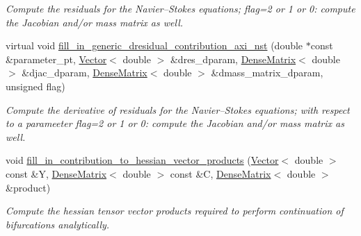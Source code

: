 \begin{DoxyCompactItemize}
\begin{DoxyCompactList}\small\item\em Compute the residuals for the Navier--Stokes equations; flag=2 or 1 or 0\+: compute the Jacobian and/or mass matrix as well. \end{DoxyCompactList}\item 
virtual void \hyperlink{classoomph_1_1GeneralisedNewtonianAxisymmetricNavierStokesEquations_a162f23398b74cb7a99506c4f8f277811}{fill\+\_\+in\+\_\+generic\+\_\+dresidual\+\_\+contribution\+\_\+axi\+\_\+nst} (double $\ast$const \&parameter\+\_\+pt, \hyperlink{classoomph_1_1Vector}{Vector}$<$ double $>$ \&dres\+\_\+dparam, \hyperlink{classoomph_1_1DenseMatrix}{Dense\+Matrix}$<$ double $>$ \&djac\+\_\+dparam, \hyperlink{classoomph_1_1DenseMatrix}{Dense\+Matrix}$<$ double $>$ \&dmass\+\_\+matrix\+\_\+dparam, unsigned flag)
\begin{DoxyCompactList}\small\item\em Compute the derivative of residuals for the Navier--Stokes equations; with respect to a parameeter flag=2 or 1 or 0\+: compute the Jacobian and/or mass matrix as well. \end{DoxyCompactList}\item 
void \hyperlink{classoomph_1_1GeneralisedNewtonianAxisymmetricNavierStokesEquations_a2087bbf2d46364b9dc414a7ca90f25de}{fill\+\_\+in\+\_\+contribution\+\_\+to\+\_\+hessian\+\_\+vector\+\_\+products} (\hyperlink{classoomph_1_1Vector}{Vector}$<$ double $>$ const \&Y, \hyperlink{classoomph_1_1DenseMatrix}{Dense\+Matrix}$<$ double $>$ const \&C, \hyperlink{classoomph_1_1DenseMatrix}{Dense\+Matrix}$<$ double $>$ \&product)
\begin{DoxyCompactList}\small\item\em Compute the hessian tensor vector products required to perform continuation of bifurcations analytically. \end{DoxyCompactList}\end{DoxyCompactItemize}
